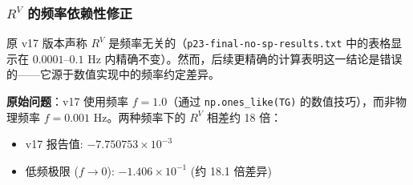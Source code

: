 
\subsubsection{$R^V$ 的频率依赖性修正}

原 v17 版本声称 $R^V$ 是频率无关的（\texttt{p23-final-no-sp-results.txt} 中的表格显示在 $0.0001$--$0.1$ Hz 内精确不变）。然而，后续更精确的计算表明这一结论是错误的——它源于数值实现中的频率约定差异。

\textbf{原始问题}：v17 使用频率 $f=1.0$（通过 \texttt{np.ones\_like(TG)} 的数值技巧），而非物理频率 $f=0.001$ Hz。两种频率下的 $R^V$ 相差约 18 倍：

\begin{itemize}
\item v17 报告值: $-7.750753\times 10^{-3}$
\item 低频极限 ($f\to 0$): $-1.406\times 10^{-1}$ (约 18.1 倍差异)
\end{itemize}


